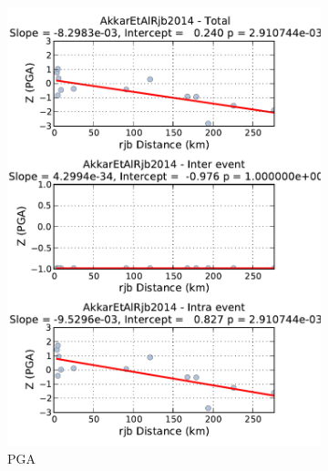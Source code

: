 \begin{figure}[htb]
  \centering
  \begin{subfigure}[b]{0.49\textwidth}
      \includegraphics[width=\textwidth]{./figures/hazard/LAquila_Residuals_with_distance.pdf}
      \caption{PGA}
      \label{fig:laquila_resid_pga}
  \end{subfigure}
    \begin{subfigure}[b]{0.49\textwidth}

\end{subfigure}
\end{figure}

